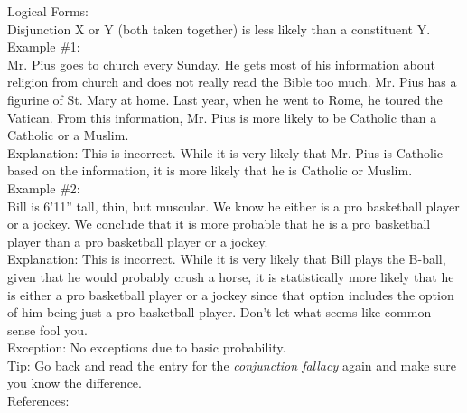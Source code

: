 \documentclass[a4paper,12pt,single,pdftex]{scrartcl}
\begin{document}
    
      Logical Forms:
    \\

    
      Disjunction X or Y (both taken together) is less likely than a constituent Y.
    \\

    
      Example \#1:
    \\

    
      Mr. Pius goes to church every Sunday.  He gets most of his information about religion from church and does not really read the Bible too much.  Mr. Pius has a figurine of St. Mary at home.  Last year, when he went to Rome, he toured the Vatican.  From this information, Mr. Pius is more likely to be Catholic than a Catholic or a Muslim.
    \\

    
      Explanation: This is incorrect.  While it is very likely that Mr. Pius is Catholic based on the information, it is more likely that he is Catholic or Muslim.
    \\

    
      Example \#2:
    \\

    
      Bill is 6’11” tall, thin, but muscular.  We know he either is a pro basketball player or a jockey.  We conclude that it is more probable that he is a pro basketball player than a pro basketball player or a jockey.
    \\

    
      Explanation: This is incorrect.  While it is very likely that Bill plays the B-ball, given that he would probably crush a horse, it is statistically more likely that he is either a pro basketball player or a jockey since that option includes the option of him being just a pro basketball player.  Don’t let what seems like common sense fool you.
    \\

    
      Exception: No exceptions due to basic probability.
    \\

    
      Tip: Go back and read the entry for the {\it conjunction fallacy}  again and make sure you know the difference.
    \\

    
      References:
    \\

    
      
        
      \\

      
        
\end{document}
